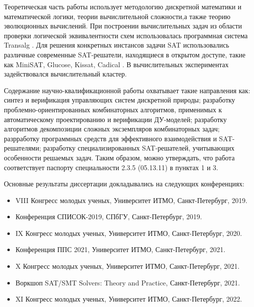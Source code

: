 \methods
{}
Теоретическая часть работы использует методологию дискретной математики и математической логики, теории вычислительной сложности,а также теорию эволюционных вычислений.
 
При построении вычислительных задач из области проверки логической эквивалентности схем использовалась программная система Transalg .
Для решения конкретных инстансов задачи SAT использовались различные современные SAT-решатели, находящиеся в открытом доступе, такие как MiniSAT, Glucose, Kissat, Cadical .
В вычислительных экспериментах задействовался вычислительный кластер.


\relevance
Содержание научно-квалификационной работы охватывает такие направления как: синтез и верификация управляющих систем дискретной природы; разработку проблемно-ориентированных комбинаторных алгоритмов, применимых к автоматическому проектированию и верификации ДУ-моделей; разработку алгоритмов декомпозиции сложных эксземпляров комбинаторных задач; разрработку программных средств для эффективного взаимодействия и SAT-решателями; разработку специализированных SAT-решателей, учитывающих особенности решаемых задач.
Таким образом, можно утверждать, что работа соответствует паспорту специальности 2.3.5 (05.13.11) в пунктах 1 и 3.


\reliability
\todo{}


\probation
Основные результаты диссертации докладывались на следующих конференциях:
\begin{itemize}[beginpenalty=10000]
    \item VIII Конгресс молодых ученых, Университет ИТМО, Санкт-Петербург, 2019.
    \item Конференция СПИСОК-2019, СПбГУ, Санкт-Петербург, 2019.
    \item IX Конгресс молодых ученых, Университет ИТМО, Санкт-Петербург, 2020.
    \item Конференция ППС 2021, Университет ИТМО, Санкт-Петербург, 2021.
    \item X Конгресс молодых ученых, Университет ИТМО, Санкт-Петербург, 2021.
    \item Воркшоп SAT/SMT Solvers: Theory and Practice, Санкт-Петербург, 2021.
    \item XI Конгресс молодых ученых, Университет ИТМО, Санкт-Петербург, 2022.
\end{itemize}

